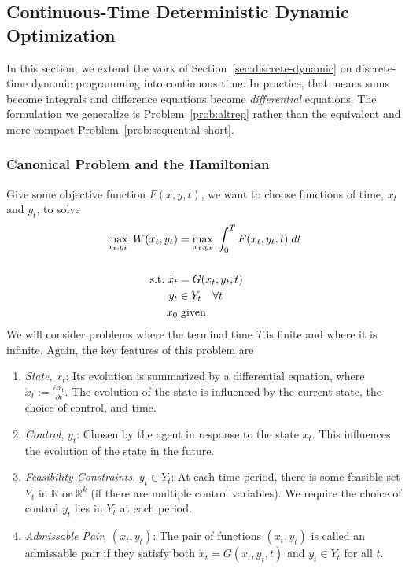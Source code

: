 \documentclass[12pt]{article}
\numberwithin{equation}{section} %
\theoremstyle{plain}
\theoremstyle{definition}
\theoremstyle{remark}
\newcommand{\R}{\mathbb{R}}
\newcommand{\Rn}{\mathbb{R}^n}
\newcommand{\Rk}{\mathbb{R}^k}
\begin{document}
\clearpage
\subsection{Continuous-Time Deterministic Dynamic Optimization}
\label{sec:continuous-dynamic}

In this section, we extend the work of
Section~\ref{sec:discrete-dynamic} on discrete-time dynamic programming
into continuous time. In practice, that means sums become integrals and
difference equations become \emph{differential} equations.  The
formulation we generalize is Problem~\ref{prob:altrep} rather than the
equivalent and more compact Problem~\ref{prob:sequential-short}.

\subsubsection{Canonical Problem and the Hamiltonian}

Give some objective function $F(x,y,t)$, we want to choose functions
of time, $x_t$ and $y_t$, to solve
\begin{align}
  \max_{x_t,y_t} \; W(x_t,y_t) &=
  \max_{x_t,y_t} \; \int^{T}_{0} F(x_t,y_t,t) \; dt
  \label{prob:cts-dynamic} \\\notag\\
  \text{s.t.} \;
   \dot{x}_t &= G(x_t,y_t,t) \notag \\
   y_t &\in Y_t \quad \forall t\notag \\
   x_0  &\;\text{given} \notag
\end{align}
We will consider problems where the terminal time $T$ is finite and
where it is infinite.
Again, the key features of this problem are
\begin{enumerate}
  \item \emph{State}, $x_t$:
    Its evolution is summarized by a differential equation, where
    $\dot{x}_t := \frac{\partial x_t}{\partial t}$. The evolution of the
    state is influenced by the current state, the choice of control, and
    time.
  \item \emph{Control}, $y_t$: Chosen by the agent in response to the
    state $x_t$. This influences the evolution of the state in the
    future.
  \item \emph{Feasibility Constraints}, $y_t\in Y_t$: At each time
    period, there is some feasible set $Y_t$ in $\R$ or $\Rk$ (if there
    are multiple control variables). We require the choice of control
    $y_t$ lies in $Y_t$ at each period.
  \item \emph{Admissable Pair}, $(x_t,y_t)$: The pair of functions
    $(x_t,y_t)$ is called an admissable pair if they satisfy both
    $\dot{x}_t = G(x_t,y_t,t)$ and $y_t\in Y_t$ for all $t$.
\end{enumerate}
\end{document}
